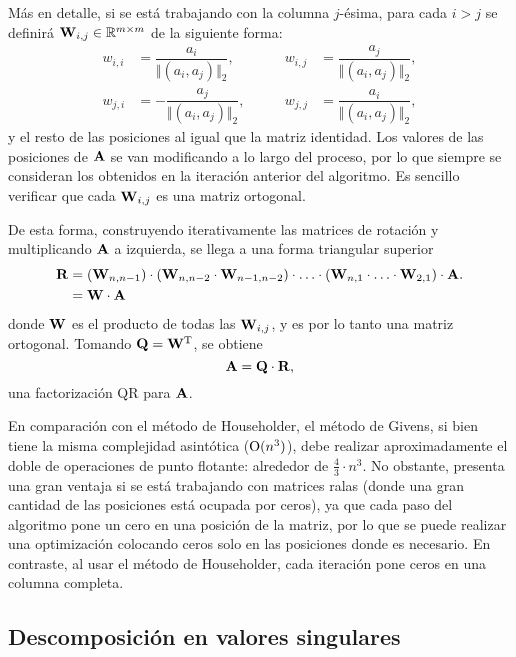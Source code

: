 Más en detalle, si se está trabajando con la columna $j$-ésima, para cada
$i>j$ se definirá $\mathbf{W}_{i,j} \in \mathbb{R}^{m \times m}$
de la siguiente forma:
\[ \begin{aligned}
    w_{i,i} &= \dfrac{a_i}{\Vert (a_{i}, a_{j}) \Vert_2}, \qquad&
    w_{i,j} &= \dfrac{a_j}{\Vert (a_{i}, a_{j}) \Vert_2}, \\
    w_{j,i} &= - \dfrac{a_j}{\Vert (a_{i}, a_{j}) \Vert_2}, \qquad&
    w_{j,j} &= \dfrac{a_i}{\Vert (a_{i}, a_{j}) \Vert_2},
\end{aligned} \]
y el resto de las posiciones al igual que la matriz identidad. Los valores de
las posiciones de $\mathbf{A}$ se van modificando a lo largo del proceso, por lo
que siempre se consideran los obtenidos en la iteración anterior del
algoritmo. Es sencillo verificar que cada $\mathbf{W}_{i,j}$ es una
matriz ortogonal.

De esta forma, construyendo iterativamente las matrices de rotación y
multiplicando $\mathbf{A}$ a izquierda, se llega a una forma triangular superior
\[ \begin{aligned}
    \mathbf{R} &= (\mathbf{W}_{n,n-1})
        \cdot (\mathbf{W}_{n,n-2} \cdot \mathbf{W}_{n-1,n-2})
        \cdot \ldots
        \cdot (\mathbf{W}_{n,1} \cdot \ldots \cdot \mathbf{W}_{2,1}) \cdot \mathbf{A}. \\
    &= \mathbf{W} \cdot \mathbf{A}
\end{aligned} \]
donde $\mathbf{W}$ es el producto de todas las $\mathbf{W}_{i,j}$, y es por lo tanto
una matriz ortogonal. Tomando $\mathbf{Q} = \mathbf{W}^{\mathrm{T}}$, se obtiene
\[ \mathbf{A} = \mathbf{Q} \cdot \mathbf{R}, \]
una factorización QR para $\mathbf{A}$.

En comparación con el método de Householder, el método de Givens, si bien
tiene la misma complejidad asintótica ($\mathrm{O}(n^3)$), debe realizar
aproximadamente el doble de operaciones de punto flotante: alrededor de
$\frac{4}{3} \cdot n^3$. No obstante, presenta una gran ventaja si se está
trabajando con matrices ralas (donde una gran cantidad de las posiciones está
ocupada por ceros), ya que cada paso del algoritmo pone un cero en una
posición de la matriz, por lo que se puede realizar una optimización colocando
ceros solo en las posiciones donde es necesario. En contraste, al usar el
método de Householder, cada iteración pone ceros en una columna completa.

\newpage
\subsection{Descomposición en valores singulares}

